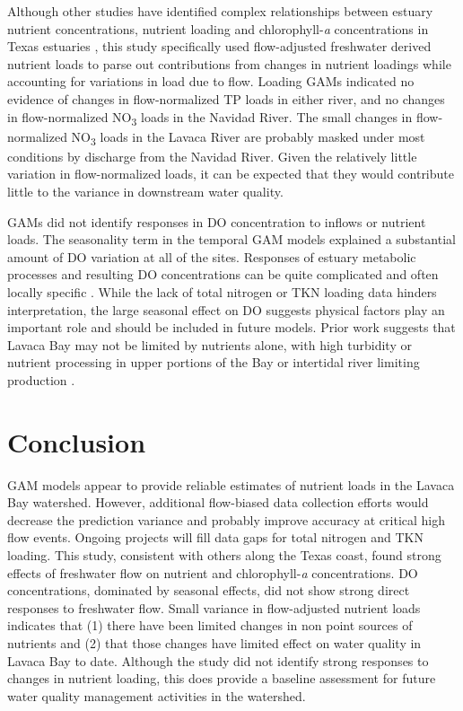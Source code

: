 \documentclass[water,article,submit,oneauthor]{Definitions/mdpi}
\begin{document}
Although other studies have identified complex relationships between
estuary nutrient concentrations, nutrient loading and
chlorophyll-\emph{a} concentrations in Texas estuaries
\citep{ornolfsdottirNutrientPulsingRegulator2004, doradoUnderstandingInteractionsFreshwater2015, ciraPhytoplanktonDynamicsLowInflow2021, tominackVariabilityPhytoplanktonBiomass2022},
this study specifically used flow-adjusted freshwater derived nutrient
loads to parse out contributions from changes in nutrient loadings while
accounting for variations in load due to flow. Loading GAMs indicated no
evidence of changes in flow-normalized TP loads in either river, and no
changes in flow-normalized NO\textsubscript{3} loads in the Navidad
River. The small changes in flow-normalized NO\textsubscript{3} loads in
the Lavaca River are probably masked under most conditions by discharge
from the Navidad River. Given the relatively little variation in
flow-normalized loads, it can be expected that they would contribute
little to the variance in downstream water quality.

GAMs did not identify responses in DO concentration to inflows or
nutrient loads. The seasonality term in the temporal GAM models
explained a substantial amount of DO variation at all of the sites.
Responses of estuary metabolic processes and resulting DO concentrations
can be quite complicated and often locally specific
\citep{caffreyFactorsControllingNet2004}. While the lack of total
nitrogen or TKN loading data hinders interpretation, the large seasonal
effect on DO suggests physical factors play an important role and should
be included in future models. Prior work suggests that Lavaca Bay may
not be limited by nutrients alone, with high turbidity or nutrient
processing in upper portions of the Bay or intertidal river limiting
production \citep{russell_effect_2006}.

\hypertarget{conclusion}{%
\section{Conclusion}\label{conclusion}}

GAM models appear to provide reliable estimates of nutrient loads in the
Lavaca Bay watershed. However, additional flow-biased data collection
efforts would decrease the prediction variance and probably improve
accuracy at critical high flow events. Ongoing projects will fill data
gaps for total nitrogen and TKN loading. This study, consistent with
others along the Texas coast, found strong effects of freshwater flow on
nutrient and chlorophyll-\emph{a} concentrations. DO concentrations,
dominated by seasonal effects, did not show strong direct responses to
freshwater flow. Small variance in flow-adjusted nutrient loads
indicates that (1) there have been limited changes in non point sources
of nutrients and (2) that those changes have limited effect on water
quality in Lavaca Bay to date. Although the study did not identify
strong responses to changes in nutrient loading, this does provide a
baseline assessment for future water quality management activities in
the watershed.
\end{document}
